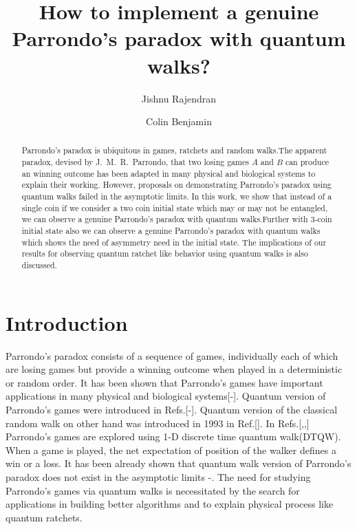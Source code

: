 \documentclass[english,aps,pra,amsmath,amssymb,showpacs,notitlepage,onecolumn]{revtex4-1}
\begin{document}
\title{How to implement a genuine Parrondo's paradox with quantum walks?}
\author{Jishnu Rajendran}
\author{Colin Benjamin}
\begin{abstract}
Parrondo's paradox is ubiquitous in games, ratchets and random walks.The apparent paradox, devised by J.~M.~R.~Parrondo, that two losing games $A$ and $B$ can produce an winning outcome has been adapted in many physical and biological systems to explain their working. However, proposals on demonstrating Parrondo's paradox using quantum walks failed in the asymptotic limits. In this work, we show that instead of a single coin if we consider a two coin initial state which may or may not be entangled, we can observe a genuine Parrondo's paradox with quantum walks.Further with 3-coin initial state also we can observe a genuine Parrondo's paradox with quantum walks which shows the need of asymmetry need in the initial state. The implications of our results for observing quantum ratchet like behavior using quantum walks is also discussed.   
\end{abstract}
\maketitle
\section{Introduction}
Parrondo's paradox consists of a sequence of games, individually each of which are losing games but provide a winning outcome when played in a deterministic or random order. It has been shown that Parrondo's games have important applications in many physical and biological systems[-]. Quantum version of Parrondo's games were introduced in Refs.[-]. Quantum version of the classical random walk on other hand was introduced in 1993 in Ref.[]. In Refs.[,,] Parrondo's games are explored using 1-D discrete time quantum walk(DTQW). When a game is played, the net expectation of position of the walker defines a win or a loss. It has been already shown that quantum walk version of Parrondo's paradox does not exist in the asymptotic limits \cite{flitney}-\cite{minli}. The need for studying Parrondo's games via quantum walks is necessitated by the search for applications in building better algorithms\cite{ken} and to explain physical process like quantum ratchets\cite{chandru2}.
\end{document}
